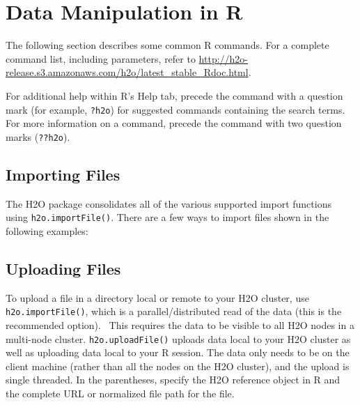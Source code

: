 {{

\newpage
\section{Data Manipulation in R}

The following section describes some common R commands. For a complete command list, including parameters, refer to {\url{http://h2o-release.s3.amazonaws.com/h2o/latest_stable_Rdoc.html}}.

For additional help within R's Help tab, precede the command with a question mark (for example, {\texttt{?h2o}}) for suggested commands containing the search terms. For more information on a command, precede the command with two question marks ({\texttt{??h2o}}).

\subsection{Importing Files}

The H2O package consolidates all of the various supported import functions using {\texttt{h2o.importFile()}}. %
There are a few ways to import files shown in the following examples:

\waterExampleInR
\medskip


\subsection{Uploading Files}

To upload a file in a directory local or remote to your H2O cluster, use {\texttt{h2o.importFile()}}, which is a parallel/distributed read of the data (this is the recommended option).  This requires the data to be visible to all H2O nodes in a multi-node cluster. {\texttt{h2o.uploadFile()}} uploads data local to your H2O cluster as well as uploading data local to your R session. The data only needs to be on the client machine (rather than all the nodes on the H2O cluster), and the upload is single threaded. In the parentheses, specify the H2O reference object in R and the complete URL or normalized file path for the file.


\waterExampleInR
\medskip



}}
